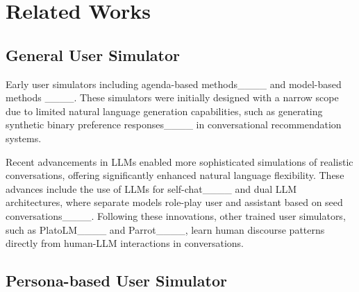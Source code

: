 \section{Related Works}
\subsection{General User Simulator}

Early user simulators including agenda-based methods____ and model-based methods ____. These simulators were initially designed with a narrow scope due to limited natural language generation capabilities, such as generating synthetic binary preference responses____ in conversational recommendation systems.  

Recent advancements in LLMs enabled more sophisticated simulations of realistic conversations, offering significantly enhanced natural language flexibility. These advances include the use of LLMs for self-chat____ and dual LLM architectures, where separate models role-play user and assistant based on seed conversations____. Following these innovations, other trained user simulators, such as PlatoLM____ and Parrot____, learn human discourse patterns directly from human-LLM interactions in conversations.





\subsection{Persona-based User Simulator}

